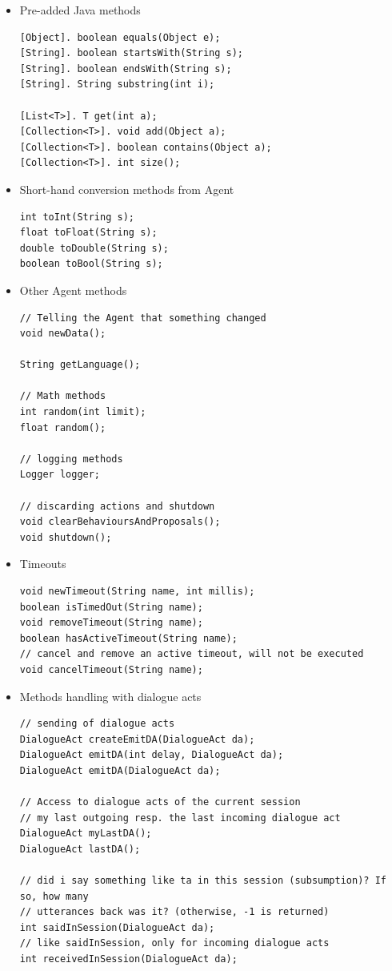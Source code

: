 \begin{itemize}
\item Pre-added Java methods
\begin{lstlisting}
[Object]. boolean equals(Object e);
[String]. boolean startsWith(String s);
[String]. boolean endsWith(String s);
[String]. String substring(int i);

[List<T>]. T get(int a);
[Collection<T>]. void add(Object a);
[Collection<T>]. boolean contains(Object a);
[Collection<T>]. int size();
\end{lstlisting}

\item Short-hand conversion methods from Agent
\begin{lstlisting}
int toInt(String s);
float toFloat(String s);
double toDouble(String s);
boolean toBool(String s);
\end{lstlisting}

\item Other Agent methods
\begin{lstlisting}
// Telling the Agent that something changed
void newData();

String getLanguage();

// Math methods
int random(int limit);
float random();

// logging methods
Logger logger;

// discarding actions and shutdown
void clearBehavioursAndProposals();
void shutdown();
\end{lstlisting}

\item Timeouts
\begin{lstlisting}
void newTimeout(String name, int millis);
boolean isTimedOut(String name);
void removeTimeout(String name);
boolean hasActiveTimeout(String name);
// cancel and remove an active timeout, will not be executed
void cancelTimeout(String name);
\end{lstlisting}

\item Methods handling with dialogue acts
\begin{lstlisting}
// sending of dialogue acts
DialogueAct createEmitDA(DialogueAct da);
DialogueAct emitDA(int delay, DialogueAct da);
DialogueAct emitDA(DialogueAct da);

// Access to dialogue acts of the current session
// my last outgoing resp. the last incoming dialogue act
DialogueAct myLastDA();
DialogueAct lastDA();

// did i say something like ta in this session (subsumption)? If so, how many
// utterances back was it? (otherwise, -1 is returned)
int saidInSession(DialogueAct da);
// like saidInSession, only for incoming dialogue acts
int receivedInSession(DialogueAct da);


\end{lstlisting}
\end{itemize}
